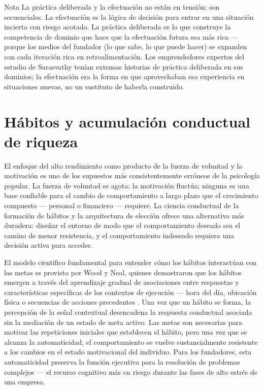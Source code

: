\begin{admonition}{Nota}
La práctica deliberada y la efectuación no están en tensión; son secuenciales. La efectuación
es la lógica de decisión para entrar en una situación incierta con riesgo acotado. La práctica
deliberada es lo que construye la competencia de dominio que hace que la efectuación futura sea
más rica --- porque los medios del fundador (lo que sabe, lo que puede hacer) se expanden con
cada iteración rica en retroalimentación. Los emprendedores expertos del estudio de Sarasvathy
tenían extensas historias de práctica deliberada en sus dominios; la efectuación era la forma
en que aprovechaban esa experiencia en situaciones nuevas, no un sustituto de haberla
construido.
\end{admonition}

\section{Hábitos y acumulación conductual de riqueza}\label{sec:habits-wealth}

El enfoque del alto rendimiento como producto de la fuerza de voluntad y la motivación es uno de
los supuestos más consistentemente erróneos de la psicología popular. La fuerza de voluntad se
agota; la motivación fluctúa; ninguna es una base confiable para el cambio de comportamiento a
largo plazo que el crecimiento compuesto --- personal o financiero --- requiere. La ciencia
conductual de la formación de hábitos y la arquitectura de elección ofrece una alternativa más
duradera: diseñar el entorno de modo que el comportamiento deseado sea el camino de menor
resistencia, y el comportamiento indeseado requiera una decisión activa para acceder.

El modelo científico fundamental para entender cómo los hábitos interactúan con las metas es
provisto por Wood y Neal, quienes demostraron que los hábitos emergen a través del aprendizaje
gradual de asociaciones entre respuestas y características específicas de los contextos de
ejecución --- hora del día, ubicación física o secuencias de acciones precedentes
\parencite{wood2007habits}. Una vez que un hábito se forma, la percepción de la señal contextual
desencadena la respuesta conductual asociada sin la mediación de un estado de meta activo. Las
metas son necesarias para motivar las repeticiones iniciales que establecen el hábito, pero una
vez que se alcanza la automaticidad, el comportamiento se vuelve sustancialmente resistente a
los cambios en el estado motivacional del individuo. Para los fundadores, esta automaticidad
preserva la función ejecutiva para la resolución de problemas complejos --- el recurso cognitivo
más en riesgo durante las fases de alto estrés de una empresa.

